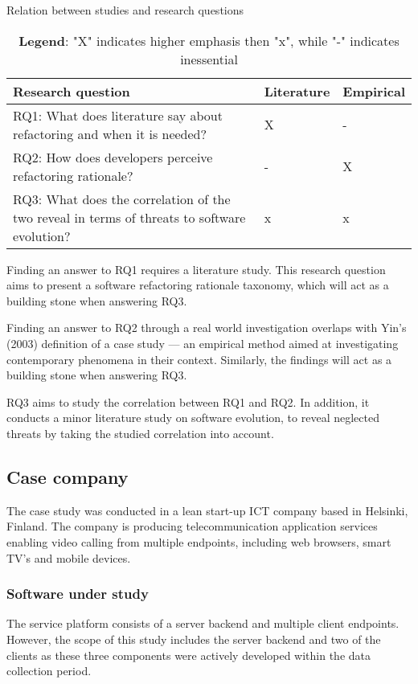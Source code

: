 \documentclass[english,12pt,a4paper,pdftex,sci,utf8]{aaltothesis}
\begin{document}
\begin{table}[ht!]
\centering
\caption{Relation between studies and research questions}
\label{table:researchQuestions}
    \begin{tabular}{ p{10cm} m{2cm} m{2cm}  }
     \hline
     \textbf{Research question}  &\textbf{Literature}  &\textbf{Empirical}  \\
     \hline
     RQ1: What does literature say about refactoring and when it is needed?                         &X      &-  \\
     \hline
     RQ2: How does developers perceive refactoring rationale?                                       &-      &X  \\
     \hline
     RQ3: What does the correlation of the two reveal in terms of threats to software evolution?    &x      &x  \\
     \hline
    \end{tabular}
\centering
\caption*{  \textbf{Legend}: "X" indicates higher emphasis then "x", while "-" indicates inessential}
\end{table}

Finding an answer to RQ1 requires a literature study. This research question aims to present a software refactoring rationale taxonomy, which will act as a building stone when answering RQ3.

Finding an answer to RQ2 through a real world investigation overlaps with Yin's (2003) definition of a case study --- an empirical method aimed at investigating contemporary phenomena in their context. Similarly, the findings will act as a building stone when answering RQ3.

RQ3 aims to study the correlation between RQ1 and RQ2. In addition, it conducts a minor literature study on software evolution, to reveal neglected threats by taking the studied correlation into account.

\subsection{Case company} \label{caseCompany}
The case study was conducted in a lean start-up ICT company based in Helsinki, Finland. The company is producing  telecommunication application services enabling video calling from multiple endpoints, including web browsers, smart TV's and mobile devices. 
\subsubsection*{Software under study} \label{software}
The service platform consists of a server backend and multiple client endpoints. However, the scope of this study includes the server backend and two of the clients as these three components were actively developed within the data collection period. 
\end{document}
